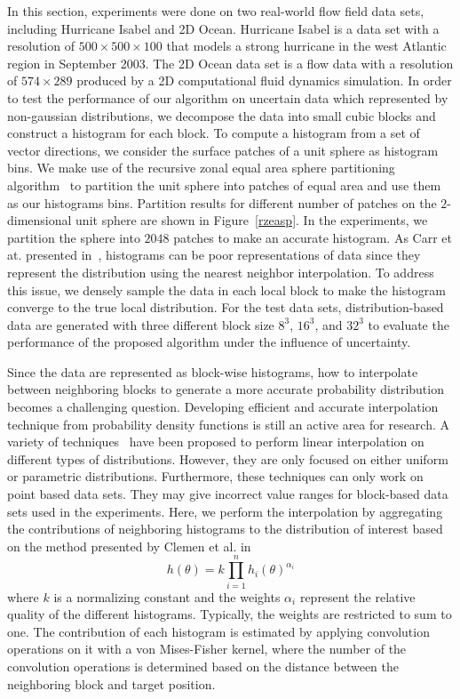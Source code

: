 In this section, experiments were done on two real-world flow field data sets, including Hurricane Isabel and 2D Ocean. Hurricane Isabel is a data set with a resolution of $500 \times 500 \times 100$ that models a strong hurricane in the west Atlantic region in September 2003. The 2D Ocean data set is a flow data with a resolution of $574 \times 289$ produced by a 2D computational fluid dynamics simulation. In order to test the performance of our algorithm on uncertain data which represented by non-gaussian distributions, we decompose the data into small cubic blocks and construct a histogram for each block. To compute a histogram from a set of vector directions, we consider the surface patches of a unit sphere as histogram bins. We make use of the recursive zonal equal area sphere partitioning algorithm~\cite{leopardi2006} to partition the unit sphere into patches of equal area and use them as our histograms bins. Partition results for different number of patches on the $2$-dimensional unit sphere are shown in Figure~\ref{rzeasp}. In the experiments, we partition the sphere into $2048$ patches to make an accurate histogram. As Carr et at. presented in~\cite{Carr:2006:HIS:1187627.1187777}, histograms can be poor representations of data since they represent the distribution using the nearest neighbor interpolation. To address this issue, we densely sample the data in each local block to make the histogram converge to the true local distribution. For the test data sets, distribution-based data are generated with three different block size $8^3$, $16^3$, and $32^3$ to evaluate the performance of the proposed algorithm under the influence of uncertainty.

Since the data are represented as block-wise histograms, how to interpolate between neighboring blocks to generate a more accurate probability distribution becomes a challenging question. Developing efficient and accurate interpolation technique from probability density functions is still an active area for research. A variety of techniques~\cite{10.1109/TVCG.2013.208, 10.1109/TVCG.2012.249} have been proposed to perform linear interpolation on different types of distributions. However, they are only focused on either uniform or parametric distributions. Furthermore, these techniques can only work on point based data sets. They may give incorrect value ranges for block-based data sets used in the experiments. Here, we perform the interpolation by aggregating the contributions of neighboring histograms to the distribution of interest based on the method presented by Clemen et al. in~\cite{aggregation99}
\begin{equation}
  {h(\theta)} = k\prod\limits_{i = 1}^n {h{{_i}(\theta)}^{{\alpha _i}}}
\end{equation}
where $k$ is a normalizing constant and the weights ${{\alpha _i}}$ represent the relative quality of the different histograms. Typically, the weights are restricted to sum to one. The contribution of each histogram is estimated by applying convolution operations on it with a von Mises-Fisher kernel, where the number of the convolution operations is determined based on the distance between the neighboring block and target position.

